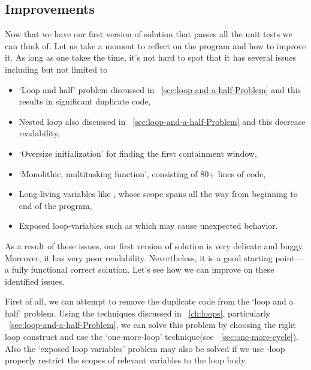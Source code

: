 \subsection{Improvements}
Now that we have our first version of solution that passes all the unit tests we can think of.
Let us take a moment to reflect on the program and how to improve it.
As long as one takes the time, it's not hard to spot that
it has several issues including but not limited to
\begin{itemize}
    \item `Loop and half' problem discussed in ~\autoref{sec:loop-and-a-half-Problem} and this
    results in significant duplicate code,
    \item Nested loop also discussed in ~\autoref{sec:loop-and-a-half-Problem} and this
    decrease readability,
    \item `Oversize initialization' for finding the first containment window,
    \item `Monolithic, multitasking function', consisting of 80+ lines of code,
    \item Long-living variables like , whose scope spans all the way from
    beginning to end of the program,
    \item Exposed loop-variables such as  which may cause unexpected behavior.
\end{itemize}
As a result of these issues, our first version of solution is very delicate and buggy.
Moreover, it has very poor readability.
Nevertheless, it is a good starting point---a fully functional correct solution.
Let's see how we can improve on these identified issues.

First of all, we can attempt to remove the duplicate code from the `loop and a half' problem.
Using the techniques discussed in ~\autoref{ch:loops}, particularly
~\autoref{sec:loop-and-a-half-Problem}, we can solve this problem by choosing the right loop
construct and use the `one-more-loop' technique(see ~\autoref{sec:one-more-cycle}).
Also the `exposed loop variables' problem may also be solved if we use -loop properly
restrict the scopes of relevant variables to the loop body.

